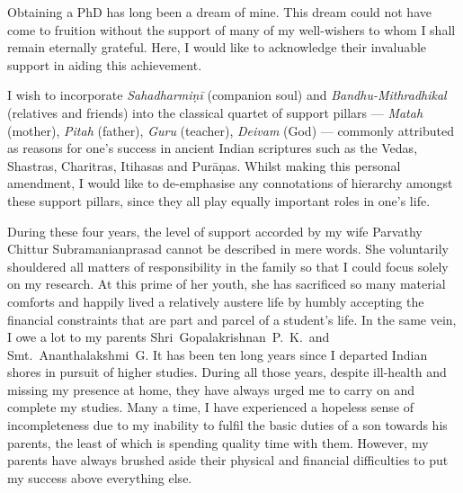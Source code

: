 
\vspace*{-17mm}

\addlines[1]

Obtaining a PhD has long been a dream of mine. This dream could not have come to
fruition without the support of many of my well-wishers to whom I shall remain
eternally grateful. Here, I would like to acknowledge their invaluable support
in aiding this achievement.

I wish to incorporate \emph{Sahadharmiṇī} (companion soul) and
\emph{Bandhu-Mithradhikal} (relatives and friends) into the classical quartet of
support pillars --- \emph{Matah} (mother), \emph{Pitah} (father), \emph{Guru}
(teacher), \emph{Deivam} (God) --- commonly attributed as reasons for one's
success in ancient Indian scriptures such as the Vedas, Shastras, Charitras,
Itihasas and Purāṇas. Whilst making this personal amendment, I would like to
de-emphasise any connotations of hierarchy amongst these support pillars, since
they all play equally important roles in one's life.

During these four years, the level of support accorded by my wife Parvathy Chittur
Subramanianprasad cannot be described in mere words. She voluntarily shouldered
all matters of responsibility in the family so that I could focus solely on my
research. At this prime of her youth, she has sacrificed so many material
comforts and happily lived a relatively austere life by humbly accepting the
financial constraints that are part and parcel of a student's life. In the same
vein, I owe a lot to my parents Shri~Gopalakrishnan~P.~K.\ and
Smt.~Ananthalakshmi~G. It has been ten long years since I departed Indian shores
in pursuit of higher studies. During all those years, despite ill-health and
missing my presence at home, they have always urged me to carry on and complete
my studies. Many a time, I have experienced a hopeless sense of incompleteness
due to my inability to fulfil the basic duties of a son towards his parents, the
least of which is spending quality time with them. However, my parents have
always brushed aside their physical and financial difficulties to put my success
above everything else.

